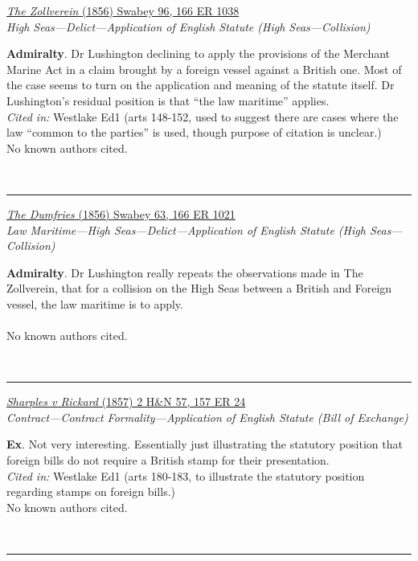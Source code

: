 \documentclass[twoside]{article}
\begin{document}
        \begin{small}
        \begin{center}
        \href{https://heinonline.org/HOL/P?h=hein.engrep/engri0166&i=1042}{\textit{The Zollverein} (1856) Swabey 96, 166 ER 1038} \label{110} \\ 
\textit{High Seas---Delict---Application of English Statute (High Seas---Collision)}\\
        \end{center}
        \textbf{Admiralty}. Dr Lushington declining to apply the provisions of the Merchant Marine Act in a claim brought by a foreign vessel against a British one. Most of the case seems to turn on the application and meaning of the statute itself. Dr Lushington’s residual position is that “the law maritime” applies.\\\textit{Cited in: }Westlake Ed1 (arts 148-152, used to suggest there are cases where the law “common to the parties” is used, though purpose of citation is unclear.)\\No known authors cited.
        \end{small}\\
        \rule{\textwidth}{0.5pt}
        

        \begin{small}
        \begin{center}
        \href{https://heinonline.org/HOL/P?h=hein.engrep/engri0166&i=1025}{\textit{The Dumfries} (1856) Swabey 63, 166 ER 1021} \label{111} \\ 
\textit{Law Maritime---High Seas---Delict---Application of English Statute (High Seas---Collision)}\\
        \end{center}
        \textbf{Admiralty}. Dr Lushington really repeats the observations made in The Zollverein, that for a collision on the High Seas between a British and Foreign vessel, the law maritime is to apply.\\\\No known authors cited.
        \end{small}\\
        \rule{\textwidth}{0.5pt}
        

        \begin{small}
        \begin{center}
        \href{https://heinonline.org/HOL/P?h=hein.engrep/engrh0157&i=28}{\textit{Sharples v Rickard} (1857) 2 H\&N 57, 157 ER 24} \label{107} \\ 
\textit{Contract---Contract Formality---Application of English Statute (Bill of Exchange)}\\
        \end{center}
        \textbf{Ex}. Not very interesting. Essentially just illustrating the statutory position that foreign bills do not require a British stamp for their presentation.\\\textit{Cited in: }Westlake Ed1 (arts 180-183, to illustrate the statutory position regarding stamps on foreign bills.)\\No known authors cited.
        \end{small}\\
        \rule{\textwidth}{0.5pt}
        
\end{document}
